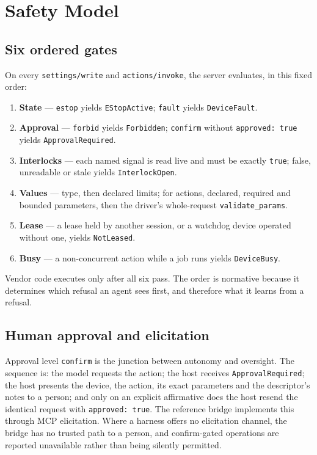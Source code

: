 \documentclass[11pt]{article}
\begin{document}


\section{Safety Model}
\label{sec:safety}

\subsection{Six ordered gates}


On every \texttt{settings/write} and \texttt{actions/invoke}, the server evaluates, in this
fixed order:

\begin{enumerate}
  \item \textbf{State} --- \texttt{estop} yields \texttt{EStopActive}; \texttt{fault} yields
    \texttt{DeviceFault}.
  \item \textbf{Approval} --- \texttt{forbid} yields \texttt{Forbidden}; \texttt{confirm}
    without \texttt{approved:\ true} yields \texttt{ApprovalRequired}.
  \item \textbf{Interlocks} --- each named signal is read live and must be exactly
    \texttt{true}; false, unreadable or stale yields \texttt{InterlockOpen}.
  \item \textbf{Values} --- type, then declared limits; for actions, declared, required and
    bounded parameters, then the driver's whole-request \texttt{validate\_params}.
  \item \textbf{Lease} --- a lease held by another session, or a watchdog device operated
    without one, yields \texttt{NotLeased}.
  \item \textbf{Busy} --- a non-concurrent action while a job runs yields \texttt{DeviceBusy}.
\end{enumerate}

Vendor code executes only after all six pass. The order is normative because it determines
which refusal an agent sees first, and therefore what it learns from a refusal.

\subsection{Human approval and elicitation}
Approval level \texttt{confirm} is the junction between autonomy and oversight. The sequence
is: the model requests the action; the host receives \texttt{ApprovalRequired}; the host
presents the device, the action, its exact parameters and the descriptor's notes to a person;
and only on an explicit affirmative does the host resend the identical request with
\texttt{approved:\ true}. The reference bridge implements this through MCP elicitation. Where
a harness offers no elicitation channel, the bridge has no trusted path to a person, and
confirm-gated operations are reported unavailable rather than being silently permitted.
\end{document}
